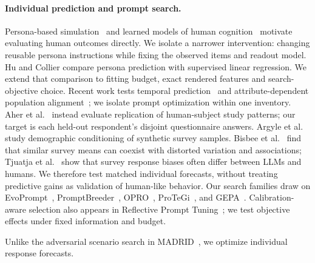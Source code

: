 \documentclass[10pt,twocolumn]{article}
\begin{document}
\paragraph{Individual prediction and prompt search.}
Persona-based simulation~\cite{hu2024persona,park2026selfreports} and learned
models of human cognition~\cite{binz2025centaur} motivate evaluating human
outcomes directly. We isolate a narrower intervention: changing reusable
persona instructions while fixing the observed items and readout model.
Hu and Collier compare persona prediction with supervised linear regression.
We extend that comparison to fitting budget, exact rendered features and
search-objective choice. Recent work tests temporal prediction~\cite{jia2026reliably}
and attribute-dependent population alignment~\cite{frohling2026attributes};
we isolate prompt optimization within one inventory. Aher et al.~\cite{aher2023simulation} instead evaluate
replication of human-subject study patterns; our target is each held-out
respondent's disjoint questionnaire answers.
Argyle et al.~\cite{argyle2023samples} study demographic conditioning of
synthetic survey samples. Bisbee et al.~\cite{bisbee2024synthetic} find that
similar survey means can coexist with distorted variation and associations;
Tjuatja et al.~\cite{tjuatja2024biases} show that survey response biases often
differ between LLMs and humans. We therefore test matched individual forecasts,
without treating predictive gains as validation of human-like behavior.
Our search families draw on EvoPrompt~\cite{guo2024connecting},
PromptBreeder~\cite{fernando2024promptbreeder}, OPRO~\cite{yang2024opro},
ProTeGi~\cite{pryzant2023protegi}, and GEPA~\cite{agrawal2025gepa}. Calibration-aware
selection also appears in Reflective Prompt Tuning~\cite{bayat2026reflective}; we test objective
effects under fixed information and budget.

Unlike the adversarial scenario search in MADRID~\cite{mouret2015mapping,samvelyan2024madrid},
we optimize individual response forecasts.
\end{document}

